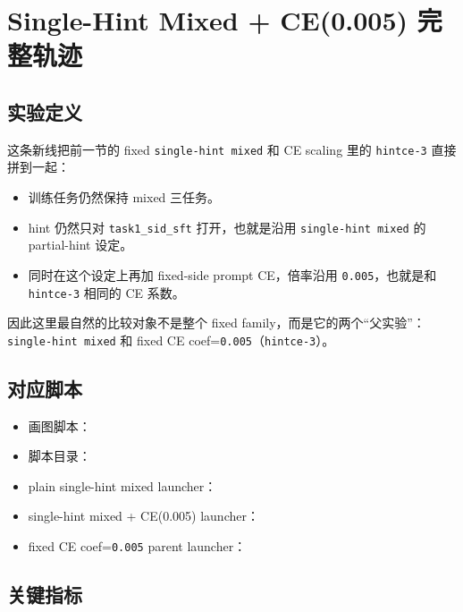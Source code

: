 \section{Single-Hint Mixed + CE(0.005) 完整轨迹}

\subsection{实验定义}

这条新线把前一节的 fixed \texttt{single-hint mixed} 和 CE scaling 里的
\texttt{hintce-3} 直接拼到一起：

\begin{itemize}
\item 训练任务仍然保持 mixed 三任务。
\item hint 仍然只对 \texttt{task1\_sid\_sft} 打开，也就是沿用 \texttt{single-hint mixed} 的 partial-hint 设定。
\item 同时在这个设定上再加 fixed-side prompt CE，倍率沿用 \texttt{0.005}，也就是和 \texttt{hintce-3} 相同的 CE 系数。
\end{itemize}

因此这里最自然的比较对象不是整个 fixed family，而是它的两个“父实验”：
\texttt{single-hint mixed} 和 fixed CE coef=\texttt{0.005}（\texttt{hintce-3}）。

\subsection{对应脚本}

{\footnotesize
\begin{itemize}
\item 画图脚本：
\item 脚本目录：
\item plain single-hint mixed launcher：
\item single-hint mixed + CE(0.005) launcher：
\item fixed CE coef=\texttt{0.005} parent launcher：
\end{itemize}
}

\subsection{关键指标}

